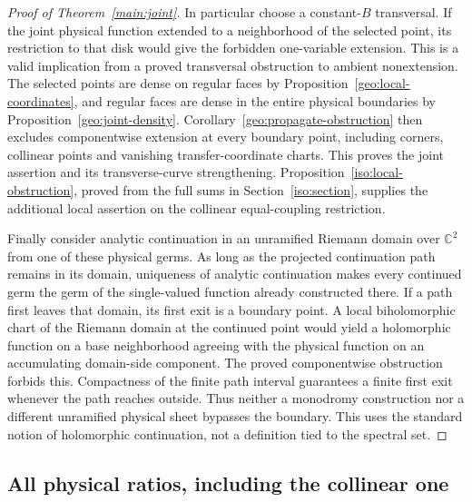 \documentclass[11pt]{article}
\numberwithin{equation}{section}
\theoremstyle{definition}
\newcommand{\C}{\mathbb C}
\begin{document}
\begin{proof}[Proof of Theorem~\ref{main:joint}]
In particular choose a constant-\(B\) transversal. If the joint
physical function extended to a neighborhood of the selected point,
its restriction to that disk would give the forbidden one-variable
extension. This is a valid implication from a proved transversal
obstruction to ambient nonextension. The selected points are dense
on regular faces by Proposition~\ref{geo:local-coordinates}, and
regular faces are dense in the entire physical boundaries by
Proposition~\ref{geo:joint-density}. Corollary~\ref{geo:propagate-obstruction}
then excludes componentwise extension at every boundary point,
including corners, collinear points and vanishing transfer-coordinate
charts. This proves the joint assertion and its transverse-curve
strengthening. Proposition~\ref{iso:local-obstruction}, proved
from the full sums in Section~\ref{iso:section}, supplies the
additional local assertion on the collinear equal-coupling restriction.

Finally consider analytic continuation in an unramified Riemann domain
over \(\C^2\) from one of these physical germs. As long as the
projected continuation path remains in its domain, uniqueness of
analytic continuation makes every continued germ the germ of the
single-valued function already constructed there. If a path first
leaves that domain, its first exit is a boundary point. A local
biholomorphic chart of the Riemann domain at the continued point
would yield a holomorphic function on a base neighborhood agreeing
with the physical function on an accumulating domain-side component.
The proved componentwise obstruction forbids this. Compactness of
the finite path interval guarantees a finite first exit whenever the
path reaches outside. Thus neither a monodromy construction nor a
different unramified physical sheet bypasses the boundary. This
uses the standard notion of holomorphic continuation, not a
definition tied to the spectral set.
\end{proof}

\subsection{All physical ratios, including the collinear one}
\end{document}
